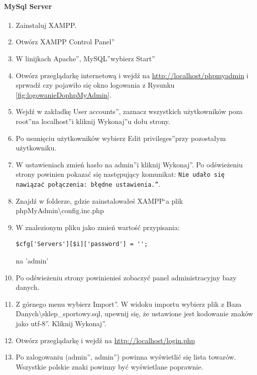 \documentclass[a4paper, 12pt]{article}
\begin{document}
\paragraph{MySql Server}
\begin{enumerate}
	\item Zainstaluj XAMPP.
	\item Otwórz \quotedblbase XAMPP Control Panel\textquotedblright
	\item W linijkach \quotedblbase Apache\textquotedblright , \quotedblbase MySQL\textquotedblright wybierz \quotedblbase Start\textquotedblright
	\item Otwórz przeglądarkę internetową i wejdź na \url{http://localhost/phpmyadmin} i sprwadź czy pojawiło się okno logowania z Rysunku \ref{fig:logowanieDophpMyAdmin}.
	\item Wejdź w zakładkę \quotedblbase User accounts\textquotedblright, zaznacz wszystkich użytkowników poza \quotedblbase root\textquotedblright na \quotedblbase localhost\textquotedblright i kliknij \quotedblbase Wykonaj\textquotedblright u dołu strony.
	\item Po usunięciu użytkowników wybierz \quotedblbase Edit privileges\textquotedblright przy pozostałym użytkowniku.
	\item W ustawieniach zmień hasło na \quotedblbase admin\textquotedblright i kliknij \quotedblbase Wykonaj\textquotedblright.
	Po odświeżeniu strony powinien pokazać się następujący komunikat:
	\texttt{\quotedblbase Nie udało się nawiązać połączenia: błędne ustawienia.\textquotedblright}.
	\item Znajdź w folderze, gdzie zainstalowałeś XAMPP`a plik phpMyAdmin\textbackslash config.inc.php
	\item W znalezionym pliku jako zmień wartość przypisania:\\
			\begin{lstlisting}
$cfg['Servers'][$i]['password'] = '';
			\end{lstlisting}
			na 'admin'
		\item Po odświeżeniu strony powinienieś zobaczyć panel administracyjny bazy danych.
		\item Z górnego menu wybierz \quotedblbase Import\textquotedblright. W widoku importu wybierz plik z Baza Danych\textbackslash sklep{\_}sportowy.sql, upewnij się, że ustawione jest kodowanie znaków jako \quotedblbase utf-8\textquotedblright. Kliknij \quotedblbase Wykonaj\textquotedblright.
		\item Otwórz przeglądarkę i wejdź na \url{http://localhost/login.php}
		\item Po zalogowaniu (\quotedblbase admin\textquotedblright, \quotedblbase admin\textquotedblright) powinna wyświetlić się lista towarów. Wszystkie polskie znaki powinny być wyświetlane poprawnie.
\end{enumerate}
\end{document}
